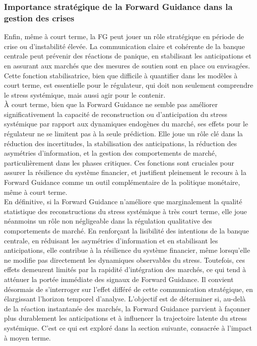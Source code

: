 \subsubsection{Importance stratégique de la Forward Guidance dans la gestion des crises}

Enfin, même à court terme, la FG peut jouer un rôle stratégique en période de crise ou d’instabilité élevée. La communication claire et cohérente de la banque centrale peut prévenir des réactions de panique, en stabilisant les anticipations et en assurant aux marchés que des mesures de soutien sont en place ou envisagées. Cette fonction stabilisatrice, bien que difficile à quantifier dans les modèles à court terme, est essentielle pour le régulateur, qui doit non seulement comprendre le stress systémique, mais aussi agir pour le contenir.\\

À court terme, bien que la Forward Guidance ne semble pas améliorer significativement la capacité de reconstruction ou d’anticipation du stress systémique par rapport aux dynamiques endogènes du marché, ses effets pour le régulateur ne se limitent pas à la seule prédiction. Elle joue un rôle clé dans la réduction des incertitudes, la stabilisation des anticipations, la réduction des asymétries d’information, et la gestion des comportements de marché, particulièrement dans les phases critiques. Ces fonctions sont cruciales pour assurer la résilience du système financier, et justifient pleinement le recours à la Forward Guidance comme un outil complémentaire de la politique monétaire, même à court terme.\\

En définitive, si la Forward Guidance n’améliore que marginalement la qualité statistique des reconstructions du stress systémique à très court terme, elle joue néanmoins un rôle non négligeable dans la régulation qualitative des comportements de marché. En renforçant la lisibilité des intentions de la banque centrale, en réduisant les asymétries d’information et en stabilisant les anticipations, elle contribue à la résilience du système financier, même lorsqu’elle ne modifie pas directement les dynamiques observables du stress. Toutefois, ces effets demeurent limités par la rapidité d’intégration des marchés, ce qui tend à atténuer la portée immédiate des signaux de Forward Guidance. Il convient désormais de s’interroger sur l’effet différé de cette communication stratégique, en élargissant l’horizon temporel d’analyse. L’objectif est de déterminer si, au-delà de la réaction instantanée des marchés, la Forward Guidance parvient à façonner plus durablement les anticipations et à influencer la trajectoire latente du stress systémique. C’est ce qui est exploré dans la section suivante, consacrée à l’impact à moyen terme.

